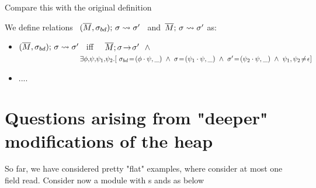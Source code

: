 Compare this with the original definition

\begin{definition}
\label{def:shallow:term}
We define relations \    $(\overline{M}, \sigma_{bd});\, {\sigma} \rightsquigarrow \sigma'$ \ and\  $\overline{M};\, {\sigma} \rightsquigarrow \sigma'$ as:

\begin{itemize}
\item
 $(\overline{M}, \sigma_{bd});\, {\sigma} \rightsquigarrow \sigma'$ \    iff \ \   $\leadstoOrig {\Mtwo} {\sigma} {\sigma'} %
\ \  \wedge $\\
$\strut  \hspace{2.9cm}\ \      \exists \phi,\!\psi,\!\psi_1,\!\psi_2.[ \  \sigma\bd\! =\! (\phi\cdot\psi,\_) \ \wedge \ \sigma\! =\! (\psi_1\cdot \psi, \_)
\ \wedge\ \sigma'\! =\! (\psi_2\cdot \psi, \_)\ \wedge\ {\psi_1,\psi_2\!\neq\! \epsilon}] $ 
\item
....
 \end{itemize}
\end{definition}
%



\section{Questions arising from "deeper" modifications of the heap}

 So far, we have considered pretty "flat" examples, where consider  at most one field read. Consider now a module with s ands as below

